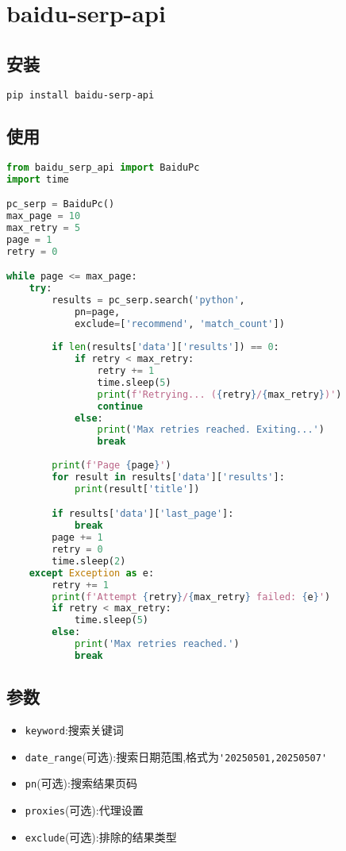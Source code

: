 \documentclass[a4paper,12pt]{article}
\begin{document}
 
\section{baidu-serp-api}
\subsection{安装}
\begin{lstlisting}[language=bash]
pip install baidu-serp-api
\end{lstlisting}

\subsection{使用}
\begin{lstlisting}[language=python]
from baidu_serp_api import BaiduPc
import time

pc_serp = BaiduPc()
max_page = 10
max_retry = 5
page = 1
retry = 0

while page <= max_page:
    try:
        results = pc_serp.search('python', 
            pn=page, 
            exclude=['recommend', 'match_count'])
        
        if len(results['data']['results']) == 0:
            if retry < max_retry:
                retry += 1
                time.sleep(5)
                print(f'Retrying... ({retry}/{max_retry})')
                continue
            else:
                print('Max retries reached. Exiting...')
                break
        
        print(f'Page {page}')
        for result in results['data']['results']:
            print(result['title'])

        if results['data']['last_page']:
            break
        page += 1
        retry = 0
        time.sleep(2)
    except Exception as e:
        retry += 1
        print(f'Attempt {retry}/{max_retry} failed: {e}')
        if retry < max_retry:
            time.sleep(5)
        else:
            print('Max retries reached.')
            break
\end{lstlisting}

\subsection{参数}
\begin{itemize}
    \item \verb|keyword|:搜索关键词
    \item \verb|date_range|(可选):搜索日期范围,格式为\verb|'20250501,20250507'|
    \item \verb|pn|(可选):搜索结果页码
    \item \verb|proxies|(可选):代理设置
    \item \verb|exclude|(可选):排除的结果类型
\end{itemize}
\end{document}
